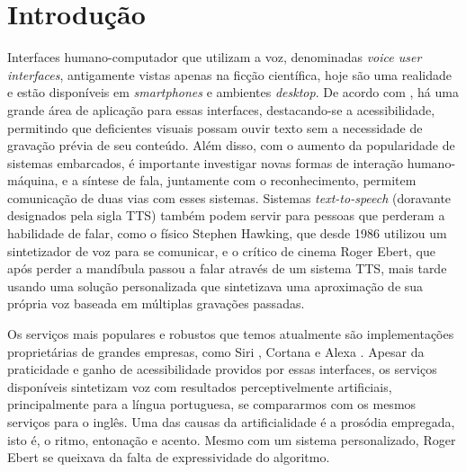

\chapter{Introdução}

Interfaces humano-computador que utilizam a voz, denominadas \emph{voice user interfaces}, antigamente vistas apenas na ficção científica, hoje são uma realidade e estão disponíveis em \emph{smartphones} e ambientes \emph{desktop}. De acordo com \cite{tts-book, martinjurafsky}, há uma grande área de aplicação para essas interfaces, destacando-se a acessibilidade, permitindo que deficientes visuais possam ouvir texto sem a necessidade de gravação prévia de seu conteúdo. Além disso, com o aumento da popularidade de sistemas embarcados, é importante investigar novas formas de interação humano-máquina, e a síntese de fala, juntamente com o reconhecimento, permitem comunicação de duas vias com esses sistemas. Sistemas \emph{text-to-speech} (doravante designados pela sigla TTS) também podem servir para pessoas que perderam a habilidade de falar, como o físico Stephen Hawking, que desde 1986 utilizou um sintetizador de voz para se comunicar, e o crítico de cinema Roger Ebert, que após perder a mandíbula passou a falar através de um sistema TTS, mais tarde usando uma solução personalizada que sintetizava uma aproximação de sua própria voz baseada em múltiplas gravações passadas. 

Os serviços mais populares e robustos que temos atualmente são implementações proprietárias de grandes empresas, como Siri \cite{siri}, Cortana \cite{cortana} e Alexa \cite{alexa}. Apesar da praticidade e ganho de acessibilidade providos por essas interfaces, os serviços disponíveis sintetizam voz com resultados perceptivelmente artificiais, principalmente para a língua portuguesa, se compararmos com os mesmos serviços para o inglês. Uma das causas da artificialidade é a prosódia empregada, isto é, o ritmo, entonação e acento. Mesmo com um sistema personalizado, Roger Ebert se queixava da falta de expressividade do algoritmo.

